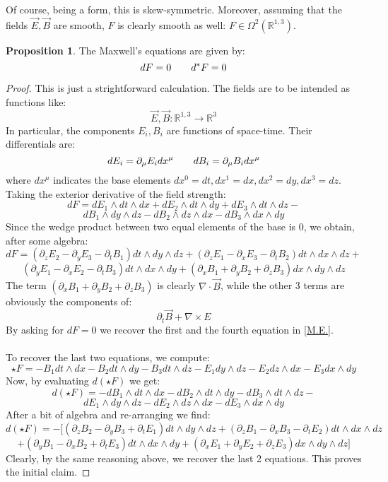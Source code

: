 \documentclass[12pt,a4paper]{report}
\theoremstyle{definition}
\theoremstyle{Theorem}
\newtheorem{Prop}[Def]{Proposition}
\theoremstyle{definition}
\theoremstyle{definition}
\begin{document}
	Of course, being a form, this is skew-symmetric. Moreover, assuming that the fields $\vec{E},\vec{B}$ are smooth, $F$ is clearly smooth as well: $F\in\Omega^2(\mathbb{R}^{1,3})$.
	\begin{Prop}
		The Maxwell's equations are given by:
		$$dF=0\hspace{20 pt} d^*F=0$$
	\end{Prop}
	\begin{proof}
		This is just a strightforward calculation. The fields are to be intended as functions like:
		$$\vec{E},\vec{B}:\mathbb{R}^{1,3}\rightarrow\mathbb{R}^3$$
		In particular, the components $E_i,B_i$ are functions of space-time. Their differentials are:
		$$dE_i=\partial_\mu E_idx^\mu\hspace{20 pt}dB_i=\partial_\mu B_idx^\mu$$
		where $dx^\mu$ indicates the base elements $dx^0=dt,dx^1=dx,dx^2=dy,dx^3=dz$. Taking the exterior derivative of the field strength:
		$$dF=dE_1\wedge dt\wedge dx+dE_2\wedge dt\wedge dy+dE_3\wedge dt\wedge dz-$$
		$$dB_1\wedge dy\wedge dz-dB_2\wedge dz\wedge dx-dB_3\wedge dx\wedge dy$$
		Since the wedge product between two equal elements of the base is 0, we obtain, after some algebra:
		$$dF=(\partial_z E_2-\partial_y E_3-\partial_t B_1)dt\wedge dy\wedge dz+(\partial_z E_1-\partial_x E_3-\partial_t B_2)dt\wedge dx\wedge dz+$$
		$$(\partial_y E_1-\partial_x E_2-\partial_t B_3)dt\wedge dx\wedge dy+ (\partial_x B_1+ \partial_y B_2+\partial_z B_3)dx\wedge dy\wedge dz$$
		The term $(\partial_x B_1+ \partial_y B_2+\partial_z B_3)$ is clearly $\nabla\cdot \vec{B}$, while the other 3 terms are obviously the components of:
		$$\partial_t\vec{B}+\nabla\times E$$
		By asking for $dF=0$ we recover the first and the fourth equation in \ref*{M.E.}.\\
		\\
		To recover the last two equations, we compute: 
		$$\star F=-B_1 dt\wedge dx-B_2dt\wedge dy-B_3 dt\wedge dz-E_1 dy\wedge dz-E_2 dz\wedge dx-E_3 dx\wedge dy$$
		Now, by evaluating $d(\star F)$ we get:
		$$d(\star F)=-dB_1\wedge dt\wedge dx-dB_2\wedge dt\wedge dy-dB_3\wedge dt\wedge dz-$$
		$$dE_1\wedge dy\wedge dz-dE_2\wedge dz\wedge dx-dE_3\wedge dx\wedge dy$$
		After a bit of algebra and re-arranging we find:
		$$d(\star F)=-\bigg[(\partial_z B_2-\partial_y B_3+\partial_t E_1)dt\wedge dy\wedge dz+
		(\partial_z B_1-\partial_x B_3-\partial_t E_2)dt\wedge dx\wedge dz
		$$
		$$+(\partial_y B_1-\partial_x B_2+\partial_t E_3)dt\wedge dx\wedge dy+(\partial_x E_1+\partial_y E_2+\partial_z E_3)dx\wedge dy\wedge dz\bigg]$$
		Clearly, by the same reasoning above, we recover the last 2 equations. This proves the initial claim.
	\end{proof}
\end{document}

